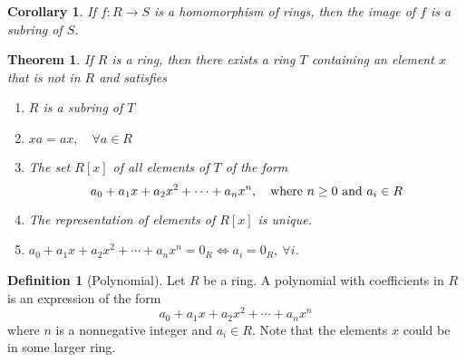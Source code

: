 \documentclass{article}
\newtheorem{theorem}{Theorem}[section]
\newtheorem{corollary}{Corollary}[section]
\theoremstyle{definition}
\newtheorem{definition}{Definition}[section]
\theoremstyle{remark}
\begin{document}
\begin{corollary}
If $f: R \to S$ is a homomorphism of rings, then the image of $f$ is a subring of $S$.
\end{corollary}






\begin{theorem}
If $R$ is a ring, then there exists a ring $T$ containing an element
$x$ that is not in $R$ and satisfies
\begin{enumerate}
\item $R$ is a subring of $T$
\item $xa = ax, \quad \forall a \in R$
\item The set $R[x]$ of all elements of $T$ of the form \[
a_0 + a_1x + a_2x^2 + \cdots + a_nx^n, \quad \textnormal{where } n \geq 0 \textnormal{ and } a_i \in R
\]
\item The representation of elements of $R[x]$ is unique.
\item $a_0 + a_1x + a_2x^2 + \cdots + a_nx^n = 0_R \iff a_i = 0_R, \ \forall i$.
\end{enumerate}
\end{theorem}


\begin{definition}[Polynomial]\label{def:polynomial}
Let $R$ be a ring. A polynomial with coefficients in $R$ is an expression of the form
\[
a_0 + a_1x + a_2x^2 + \cdots + a_nx^n
\]
where $n$ is a nonnegative integer and $a_i \in R$. Note that the elements
$x$ could be in some larger ring. 
\end{definition}
\end{document}
